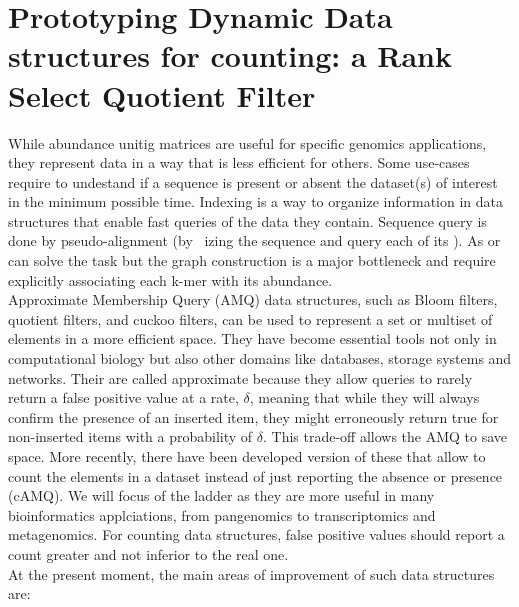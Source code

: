 \section{Prototyping Dynamic Data structures for \kmer counting: a Rank Select Quotient Filter}
\label{sec:qf}
While abundance unitig matrices are useful for specific genomics applications, they represent data in a way that is less efficient for others. Some use-cases require to undestand if a sequence is present or absent the dataset(s) of interest in the minimum possible time. Indexing is a way to organize information in data structures that enable fast queries of the data they contain. Sequence query is done by pseudo-alignment (by \kmer~izing the sequence and query each of its \kmers). As \cdbg or \ccdbg can solve the task but the graph construction is a major bottleneck and require explicitly associating each k-mer with its abundance. \\
Approximate Membership Query (AMQ) data structures, such as Bloom filters, quotient filters, and cuckoo filters, can be used to represent a set or multiset of elements in a more efficient space. They have become essential tools not only in computational biology but also other domains like databases, storage systems and networks. Their are called approximate because they allow queries to rarely return a false positive value at a rate, $\delta$, meaning that while they will always confirm the presence of an inserted item, they might erroneously return true for non-inserted items with a probability of $\delta$. This trade-off allows the AMQ to save space. More recently, there have been developed version of these that allow to count the elements in a dataset instead of just reporting the absence or presence (cAMQ). We will focus of the ladder as they are more useful in many bioinformatics applciations, from pangenomics to transcriptomics and metagenomics. For counting data structures, false positive values should report a count greater and not inferior to the real one.\\
At the present moment, the main areas of improvement of such data structures are:
